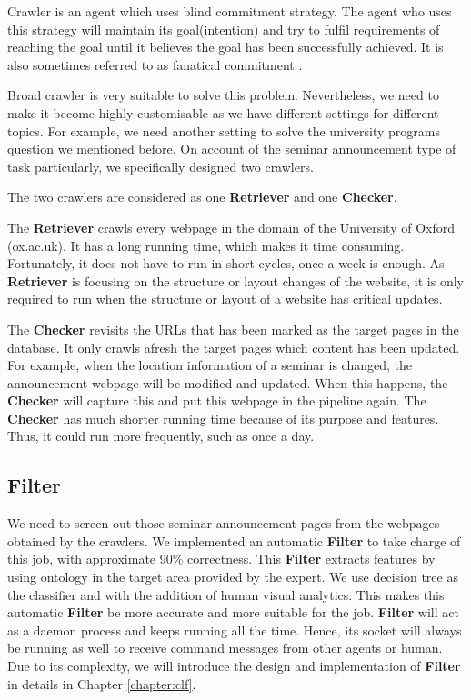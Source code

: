 Crawler is an agent which uses blind commitment strategy. The agent who uses this strategy will maintain its goal(intention) and try to fulfil requirements of reaching the goal until it believes the goal has been successfully achieved. It is also sometimes referred to as fanatical commitment \cite{Wooldridge:2009:IMS:1695886}.

Broad crawler is very suitable to solve this problem. Nevertheless, we need to make it become highly customisable as we have different settings for different topics. For example, we need another setting to solve the university programs question we mentioned before. On account of the seminar announcement type of task particularly, we specifically designed two crawlers.

The two crawlers are considered as one \textbf{Retriever} and one \textbf{Checker}.

The \textbf{Retriever} crawls every webpage in the domain of the University of Oxford (ox.ac.uk). It has a long running time, which makes it time consuming. Fortunately, it does not have to run in short cycles, once a week is enough. As \textbf{Retriever} is focusing on the structure or layout changes of the website, it is only required to run when the structure or layout of a website has critical updates.

The \textbf{Checker} revisits the URLs that has been marked as the target pages in the database. It only crawls afresh the target pages which content has been updated. For example, when the location information of a seminar is changed, the announcement webpage will be modified and updated. When this happens, the \textbf{Checker} will capture this and put this webpage in the pipeline again. The \textbf{Checker} has much shorter running time because of its purpose and features. Thus, it could run more frequently, such as once a day.

\subsection{Filter}
We need to screen out those seminar announcement pages from the webpages obtained by the crawlers. We implemented an automatic \textbf{Filter} to take charge of this job, with approximate 90\% correctness. This \textbf{Filter} extracts features by using ontology in the target area provided by the expert. We use decision tree as the classifier and with the	addition of human visual analytics. This makes this automatic \textbf{Filter} be more accurate and more suitable for the job. \textbf{Filter} will act as a daemon process and keeps running all the time. Hence, its socket will always be running as well to receive command messages from other agents or human. Due to its complexity, we will introduce the design and implementation of \textbf{Filter} in details in Chapter \ref{chapter:clf}.

